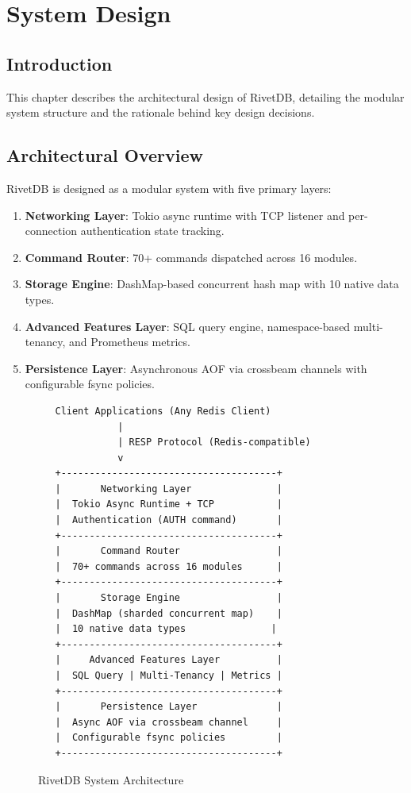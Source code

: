 \documentclass[12pt,a4paper]{report}
\begin{document}
\chapter{System Design}

\section{Introduction}

This chapter describes the architectural design of RivetDB, detailing the modular system structure and the rationale behind key design decisions.

\section{Architectural Overview}

RivetDB is designed as a modular system with five primary layers:

\begin{enumerate}[leftmargin=2.5em]
    \item \textbf{Networking Layer}: Tokio async runtime with TCP listener and per-connection authentication state tracking.
    \item \textbf{Command Router}: 70+ commands dispatched across 16 modules.
    \item \textbf{Storage Engine}: DashMap-based concurrent hash map with 10 native data types.
    \item \textbf{Advanced Features Layer}: SQL query engine, namespace-based multi-tenancy, and Prometheus metrics.
    \item \textbf{Persistence Layer}: Asynchronous AOF via crossbeam channels with configurable fsync policies.
\end{enumerate}

\begin{figure}[htbp]
\centering
\begin{verbatim}
   Client Applications (Any Redis Client)
              |
              | RESP Protocol (Redis-compatible)
              v
   +--------------------------------------+
   |       Networking Layer               |
   |  Tokio Async Runtime + TCP           |
   |  Authentication (AUTH command)       |
   +--------------------------------------+
   |       Command Router                 |
   |  70+ commands across 16 modules      |
   +--------------------------------------+
   |       Storage Engine                 |
   |  DashMap (sharded concurrent map)    |
   |  10 native data types               |
   +--------------------------------------+
   |     Advanced Features Layer          |
   |  SQL Query | Multi-Tenancy | Metrics |
   +--------------------------------------+
   |       Persistence Layer              |
   |  Async AOF via crossbeam channel     |
   |  Configurable fsync policies         |
   +--------------------------------------+
\end{verbatim}
\caption{RivetDB System Architecture}
\label{fig:architecture}
\end{figure}
\end{document}
